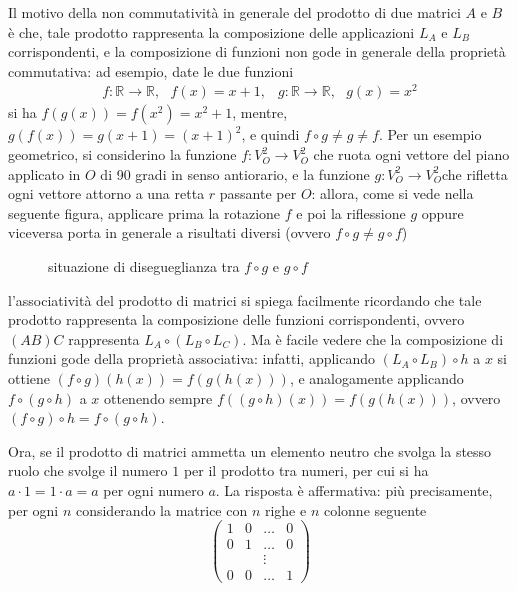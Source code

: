 \begin{oss}
  \label{oss:Compinveeproddimatrici1}
  Il motivo della non commutatività in generale del prodotto di due matrici $A$ e $B$ è che, tale prodotto
  rappresenta la composizione delle applicazioni $L_A$ e $L_B$ corrispondenti, e la composizione di funzioni
  non gode in generale della proprietà commutativa: ad esempio, date le due funzioni
  \begin{eqnarray*}
    f:\mathds{R}\to \mathds{R},\text{ } f(x)=x+1, & g: \mathds{R}\to\mathds{R}, \text{ } g(x)=x^2
  \end{eqnarray*}
  si ha $f(g(x))=f(x^2)=x^2+1$, mentre, $g(f(x))=g(x+1)=(x+1)^2$, e quindi $f\circ g\neq g\neq f$. Per un
  esempio geometrico, si considerino la funzione $f:V_O^2\to V_O^2$ che ruota ogni vettore del piano applicato
  in $O$ di 90 gradi in senso antiorario, e la funzione $g:V_O^2\to V_O^2$che rifletta ogni vettore attorno a
  una retta $r$ passante per $O$: allora, come si vede nella seguente figura, applicare prima la rotazione $f$
  e poi la riflessione $g$ oppure viceversa porta in generale a risultati diversi (ovvero $f\circ g\neq
  g\circ f$)
  \begin{figure}[ht!]
    \centering
    \resizebox{9cm}{!}{}
    \caption{situazione di disegueglianza tra $f\circ g$ e $g\circ f$}
    \label{fig:Compinveeproddimatrici4}
  \end{figure}
\end{oss}
\begin{oss}
  \label{oss:Compinveeproddimatrici2}
  l'associatività del prodotto di matrici si spiega facilmente ricordando che tale prodotto rappresenta la
  composizione delle funzioni corrispondenti, ovvero $(AB)C$ rappresenta $L_A\circ (L_B\circ L_C)$. Ma è facile
  vedere che la composizione di funzioni gode della proprietà associativa: infatti, applicando $(L_A\circ
  L_B)\circ h$ a $x$ si ottiene $(f\circ g)(h(x))=f(g(h(x)))$, e analogamente applicando $f\circ(g\circ h)$ a
  $x$ ottenendo sempre $f((g\circ h)(x))=f(g(h(x)))$, ovvero $(f\circ g)\circ h=f\circ (g\circ h)$.
\end{oss}
Ora, se il prodotto di matrici ammetta un elemento neutro che svolga la stesso ruolo che svolge il numero $1$
per il prodotto tra numeri, per cui si ha $a\cdot 1=1\cdot a =a$ per ogni numero $a$. La risposta è
affermativa: più precisamente, per ogni $n$ considerando la matrice con $n$ righe e $n$ colonne seguente
\begin{equation}
  \label{eq:Compinveeproddimatrici6}
  \begin{pmatrix}
    1 & 0 & \dots & 0\\
    0 & 1 & \dots & 0\\
      && \vdots\\
    0 & 0 & \dots & 1
  \end{pmatrix}
\end{equation}
